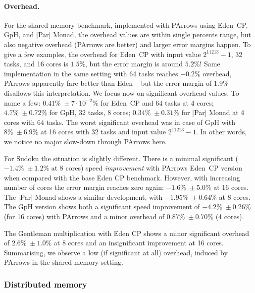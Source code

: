 \paragraph{Overhead.}

For the shared memory \rmtest benchmark, implemented with PArrows using Eden~CP, GpH, and |Par| Monad, the overhead values are within single percents range, but also negative overhead (\ie PArrows are better) and larger error margins happen. To give a few examples, the overhead for Eden~CP with input value $2^{11213}-1$, 32 tasks, and 16 cores is $1.5\%$, but the error margin is around $5.2\%$! Same implementation in the same setting with 64 tasks reaches $-0.2\%$ overhead, PArrows apparently fare better than Eden -- but the error margin of $1.9\%$ disallows this interpretation. We focus now on significant overhead values. To name a few: $0.41\%\; \pm 7\cdot 10^{-2}\%$ for Eden~CP and 64 tasks at 4 cores; $4.7\% \; \pm 0.72\%$ for GpH, 32 tasks, 8 cores; $0.34\% \; \pm 0.31\%$ for |Par| Monad at 4 cores with 64 tasks. The worst significant overhead was in case of GpH  with $8\% \; \pm 6.9\%$ at 16 cores with 32 tasks and input value $2^{11213}-1$. In other words, we notice no major slow-down through PArrows here.

For Sudoku the situation is slightly different. There is a minimal significant ($-1.4\% \; \pm 1.2\%$ at 8 cores) speed \emph{improvement} with PArrows Eden~CP version when compared with the base Eden CP benchmark. However, with increasing number of cores the error margin reaches zero again: $-1.6\% \; \pm 5.0\%$ at 16 cores. The |Par| Monad shows a similar development, \eg with $-1.95\% \; \pm 0.64\%$ at 8 cores. The GpH version shows both a significant speed improvement of $-4.2\% \; \pm 0.26\%$ (for 16 cores) with PArrows and a minor overhead of $0.87\% \; \pm 0.70\%$ (4 cores).

The Gentleman multiplication with Eden CP shows a minor significant overhead of $2.6\% \; \pm 1.0\%$ at 8 cores and an insignificant improvement at 16 cores. Summarising, we observe a low (if significant at all) overhead, induced by PArrows in the shared memory setting.

\subsubsection{Distributed memory}


